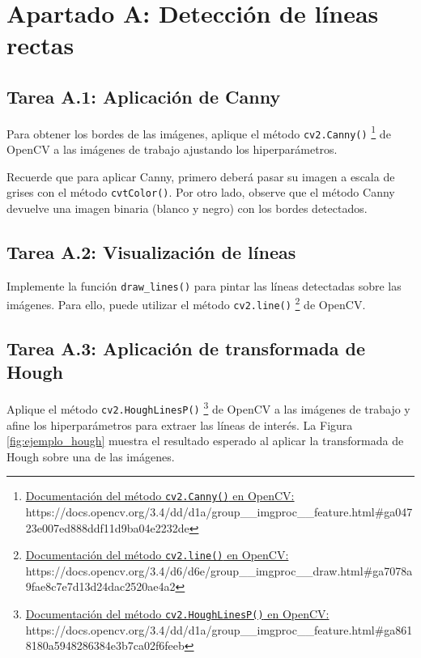 \chapter{Apartado A: \textbf{Detección de líneas rectas}}
\label{chapter:tarea_a}

\section*{Tarea A.1: Aplicación de Canny}
{}

Para obtener los bordes de las imágenes, aplique el método \texttt{cv2.Canny()} \footnote{ \href{https://docs.opencv.org/3.4/dd/d1a/group\_\_imgproc\_\_feature.html\#ga04723e007ed888ddf11d9ba04e2232de}{Documentación del método \texttt{cv2.Canny()} en OpenCV:} \\{https://docs.opencv.org/3.4/dd/d1a/group\_\_imgproc\_\_feature.html\#ga04723e007ed888ddf11d9ba04e2232de}} de OpenCV a las imágenes de trabajo ajustando los hiperparámetros.

Recuerde que para aplicar Canny, primero deberá pasar su imagen a escala de grises con el método \texttt{cvtColor()}. Por otro lado, observe que el método Canny devuelve una imagen binaria (blanco y negro) con los bordes detectados.


\section*{Tarea A.2: Visualización de líneas}
{}

Implemente la función \texttt{draw\_lines()} para pintar las líneas detectadas sobre las imágenes. Para ello, puede utilizar el método \texttt{cv2.line()} \footnote{ \href{https://docs.opencv.org/3.4/d6/d6e/group\_\_imgproc\_\_draw.html\#ga7078a9fae8c7e7d13d24dac2520ae4a2}{Documentación del método \texttt{cv2.line()} en OpenCV:} \\{https://docs.opencv.org/3.4/d6/d6e/group\_\_imgproc\_\_draw.html\#ga7078a9fae8c7e7d13d24dac2520ae4a2}} de OpenCV.


\section*{Tarea A.3: Aplicación de transformada de Hough}
{} 
Aplique el método \texttt{cv2.HoughLinesP()} \footnote{ \href{https://docs.opencv.org/3.4/dd/d1a/group\_\_imgproc\_\_feature.html\#ga8618180a5948286384e3b7ca02f6feeb}{Documentación del método \texttt{cv2.HoughLinesP()} en OpenCV:} \\{https://docs.opencv.org/3.4/dd/d1a/group\_\_imgproc\_\_feature.html\#ga8618180a5948286384e3b7ca02f6feeb}} de OpenCV a las imágenes de trabajo y afine los hiperparámetros para extraer las líneas de interés. La Figura \ref{fig:ejemplo_hough} muestra el resultado esperado al aplicar la transformada de Hough sobre una de las imágenes.


